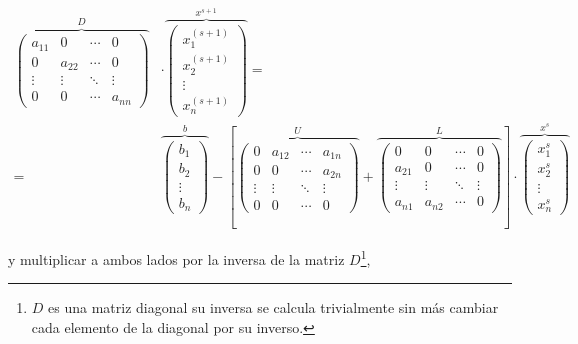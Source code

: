 \begin{align*}
\overbrace{\begin{pmatrix}
a_{11}& 0& \cdots & 0\\
0& a_{22}& \cdots & 0\\
\vdots & \vdots & \ddots & \vdots\\
0& 0& \cdots & a_{nn}
\end{pmatrix}}^D &\cdot \overbrace{\begin{pmatrix}
x_1^{(s+1)}\\
x_2^{(s+1)}\\
\vdots \\
x_n^{(s+1)}
\end{pmatrix}}^{x^{s+1}}=&\\
=&\overbrace{\begin{pmatrix}
b_1\\
b_2\\
\vdots \\
b_n
\end{pmatrix}}^b-\left[
\overbrace{\begin{pmatrix}
0& a_{12}& \cdots & a_{1n}\\
0& 0& \cdots & a_{2n}\\
\vdots & \vdots & \ddots & \vdots\\
0& 0& \cdots & 0
\end{pmatrix}}^U+
\overbrace{\begin{pmatrix}
0& 0& \cdots & 0\\
a_{21}& 0& \cdots & 0\\
\vdots & \vdots & \ddots & \vdots\\
a_{n1}& a_{n2}& \cdots & 0
\end{pmatrix}}^L \right] \cdot \overbrace{\begin{pmatrix}
x_1^s\\
x_2^s\\
\vdots \\
x_n^s
\end{pmatrix}}^{x^s}
\end{align*}

 y multiplicar a ambos lados por la inversa de la matriz $D$\footnote{$D$ es una matriz diagonal su inversa se calcula trivialmente sin más cambiar cada elemento de la diagonal por su inverso.},
 
